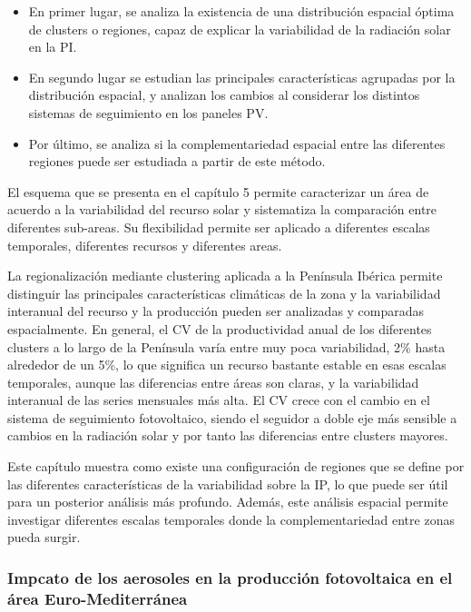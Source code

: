 \begin{itemize}
  
\item  En primer lugar, se analiza la existencia de una distribución espacial óptima de clusters o regiones, capaz de explicar la variabilidad de la radiación solar en la PI.

\item En segundo lugar se estudian las principales características agrupadas por la distribución espacial, y analizan los cambios al considerar los distintos sistemas de seguimiento en los paneles PV.

\item Por último, se analiza si la complementariedad espacial entre las diferentes regiones puede ser estudiada a partir de este método.

\end{itemize}

El esquema que se presenta en el capítulo 5 permite caracterizar un área de acuerdo a la variabilidad del recurso solar y sistematiza la comparación entre diferentes sub-areas. Su flexibilidad permite ser aplicado a diferentes escalas temporales, diferentes recursos y diferentes areas.

La regionalización mediante clustering aplicada a la Península Ibérica permite distinguir las principales características climáticas de la zona y la variabilidad interanual del recurso y la producción pueden ser analizadas y comparadas espacialmente. En general, el CV de la productividad anual de los diferentes clusters a lo largo de la Península varía entre muy poca variabilidad, 2$\%$ hasta alrededor de un 5$\%$, lo que significa un recurso bastante estable en esas escalas temporales, aunque las diferencias entre áreas son claras, y la variabilidad interanual de las series mensuales más alta. El CV crece con el cambio en el sistema de seguimiento fotovoltaico, siendo el seguidor a doble eje más sensible a cambios en la radiación solar y por tanto las diferencias entre clusters mayores.

Este capítulo muestra como existe una configuración de regiones que se define por las diferentes características de la variabilidad sobre la IP, lo que puede ser útil para un posterior análisis más profundo. Además, este análisis espacial permite investigar diferentes escalas temporales donde la complementariedad entre zonas pueda surgir.

\subsubsection{Impcato de los aerosoles en la producción fotovoltaica en el área Euro-Mediterránea}

